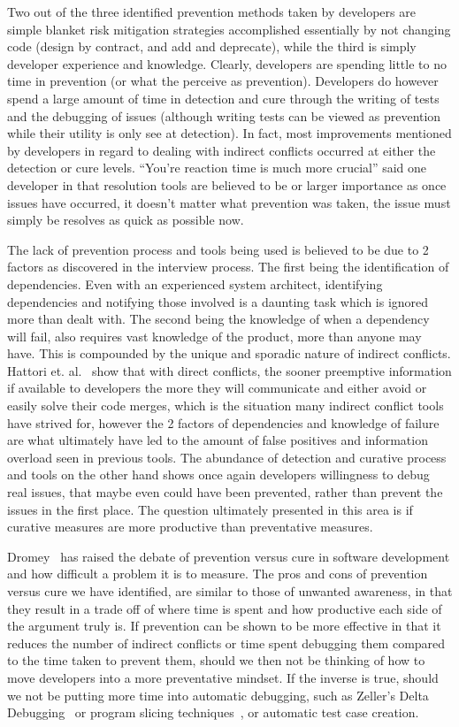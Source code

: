 \documentclass[conference]{IEEEtran}
\begin{document}
Two out of the three identified prevention methods taken by developers are simple blanket risk mitigation strategies
accomplished essentially by
not changing code (design by contract, and add and deprecate), while the third is simply developer experience and knowledge. Clearly,
developers are spending little to no time in prevention (or what the perceive as prevention). Developers do however spend a 
large amount of time in detection and cure through the
writing of tests and the debugging of issues (although writing tests can be viewed as prevention while their utility is only see at detection). 
In fact, most improvements mentioned by developers in regard to dealing with indirect
conflicts occurred at either the detection or cure levels. ``You're reaction time is much more crucial''
said one developer in that resolution tools are believed to be or larger importance as once issues have occurred, it doesn't
matter what prevention was taken, the issue must simply be resolves as quick as possible now.

The lack of prevention process and tools being used is believed to be due to 2 factors as discovered in the interview process. 
The first being the identification of dependencies.
Even with an experienced system architect, identifying dependencies and notifying those involved is a daunting task
which is ignored more than dealt with. The second being the knowledge of when a dependency will fail, also requires vast knowledge
of the product, more than anyone may have. This is compounded by the unique and sporadic nature of indirect conflicts.
Hattori et. al.~\cite{Hattori:2012:ICG} show that with direct conflicts, the
sooner preemptive information if available to developers the more they will communicate and either avoid or easily solve their code merges,
which is the situation many indirect conflict tools have strived for, however the 2 factors of dependencies and knowledge of failure
are what ultimately have led to the amount of false positives and information overload seen in previous tools. The
abundance of detection and curative process and tools on the other hand shows once again developers willingness to debug
real issues, that maybe even could have been prevented, rather than prevent the issues in the first place. The question ultimately
presented in this area is if curative measures are more productive than preventative measures.

Dromey~\cite{Dromey:2003} has raised the debate of prevention versus cure in software development and how difficult a problem it is
to measure. The pros and cons of prevention versus cure we have identified, are similar to those of unwanted awareness,
in that they result in a trade off
of where time is spent and how productive each side of the argument truly is. If prevention can be shown to be more effective in that
it reduces the number of indirect conflicts or time spent debugging them compared to the time taken to prevent them, should we then
not be thinking of how to move developers into a more preventative mindset. If the inverse is true, should we not be putting more time into automatic debugging, such as
Zeller's Delta Debugging~\cite{Zeller:2002:ICC} or program slicing techniques~\cite{Weiser:1982:PUS}, or automatic test case creation.
\end{document}
